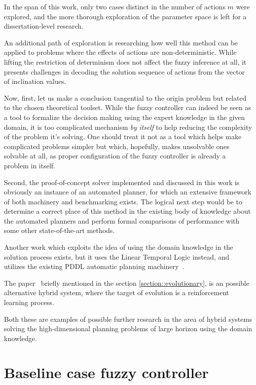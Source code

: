 \documentclass[12pt, a4paper]{report}
\begin{document}
	In the span of this work, only two cases distinct in the number of actions $m$ were explored, and the more thorough exploration of the parameter space is left for a dissertation-level research.
	
	An additional path of exploration is researching how well this method can be applied to problems where the effects of actions are non-deterministic.
	While lifting the restriction of determinism does not affect the fuzzy inference at all, it presents challenges in decoding the solution sequence of actions from the vector of inclination values.
	
	Now, first, let us make a conclusion tangential to the origin problem but related to the chosen theoretical toolset.
	While the fuzzy controller can indeed be seen as a tool to formalize the decision making using the expert knowledge in the given domain, it is too complicated mechanism \textit{by itself} to help reducing the complexity of the problem it's solving.
	One should treat it not as a tool which helps make complicated problems simpler but which, hopefully, makes unsolvable ones solvable at all, as proper configuration of the fuzzy controller is already a problem in itself.

	Second, the proof-of-concept solver implemented and discussed in this work is obviously an instance of an automated planner, for which an extensive framework of both machinery and benchmarking exists.
	The logical next step would be to determine a correct place of this method in the existing body of knowledge about the automated planners and perform formal comparisons of performance with some other state-of-the-art methods.

	Another work which exploits the idea of using the domain knowledge in the solution process exists, but it uses the Linear Temporal Logic instead, and utilizes the existing PDDL automatic planning machinery~\cite{LU2025121666}.

	The paper~\cite{song2023rl_ea} briefly mentioned in the section \ref{section::evolutionary}, is an possible alternative hybrid system, where the target of evolution is a reinforcement learning process.

	Both these are examples of possible further research in the area of hybrid systems solving the high-dimensional planning problems of large horizon using the domain knowledge.
	
	\printbibliography

	\appendix
	
	\chapter{Baseline case fuzzy controller}\label{appendix::baseline-case-fuzzy-controller}
	
	
	
\end{document}
